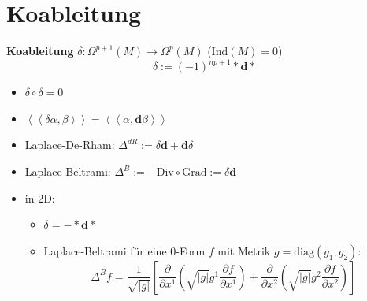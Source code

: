 \documentclass{beamer}
\renewcommand{\d}{\textbf{d}}
\newcommand{\ablx}[2]{\frac{\partial #1}{\partial x^{#2}}}
\begin{document}
  
  
  \section{Koableitung}

  \begin{frame}
    \begin{block}{\textbf{Koableitung} \( \delta: \Omega^{p+1}(M) \longrightarrow \Omega^{p}(M) \) \qquad (Ind\( (M)=0 \))}
      \pause
      \[ \delta := (-1)^{np+1} * \d * \]
      \begin{itemize}
        \item<3-> \( \delta\circ\delta = 0 \) 
        \item<4-> \( \left\langle\left\langle \delta\alpha , \beta \right\rangle\right\rangle = \left\langle\left\langle \alpha , \d\beta \right\rangle\right\rangle \)
        \item<5-> Laplace-De-Rham: \( \Delta^{dR} := \delta\d + \d\delta \)
        \item<6-> Laplace-Beltrami: \( \Delta^{B} := -\text{Div}\circ\text{Grad} := \delta\d \)
        \item<7-> in 2D:
              \begin{itemize}
                \item \( \delta = - * \d * \)
                \item Laplace-Beltrami für eine \( 0 \)-Form \( f \) mit Metrik \( g=\text{diag}(g_{1}, g_{2}) \):
                      \[ \Delta^{B}f = \frac{1}{\sqrt{|g|}} \left[ \ablx{}{1}\left( \sqrt{|g|}g^{1}\ablx{f}{1}\right) +  \ablx{}{2}\left( \sqrt{|g|}g^{2}\ablx{f}{2}\right)\right] \]
              \end{itemize}
      \end{itemize}
    \end{block}
  \end{frame}

  
\end{document}
